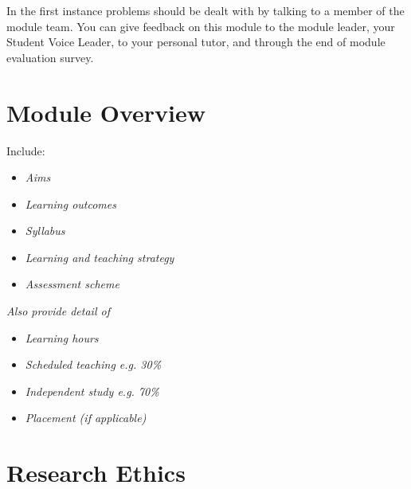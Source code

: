 \documentclass{MDXHandbook}
\begin{document}
In the first instance problems should be dealt with by talking to a member of the module team. You can give feedback on this module to the module leader, your Student Voice Leader, to your personal tutor, and through the end of module evaluation survey.

\section{Module Overview}
Include:
\begin{itemize}
\item \emph{Aims}
\item \emph{Learning outcomes}
\item \emph{Syllabus}
\item \emph{Learning and teaching strategy}
\item \emph{Assessment scheme}
\end{itemize}

\emph{Also provide detail of}
\begin{itemize}
\item \emph{Learning hours}
\item \emph{Scheduled teaching  e.g. 30\%}
\item \emph{Independent study e.g. 70\%}
\item \emph{Placement (if applicable)}
\end{itemize}

\section*{Research Ethics}
\end{document}
